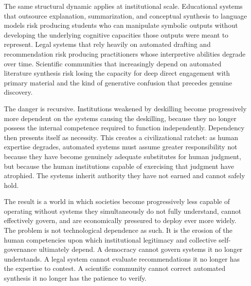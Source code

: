 \documentclass[12pt, a4paper]{article}
\theoremstyle{remark}
\begin{document}
The same structural dynamic applies at institutional scale. Educational systems that outsource explanation, summarization, and conceptual synthesis to language models risk producing students who can manipulate symbolic outputs without developing the underlying cognitive capacities those outputs were meant to represent. Legal systems that rely heavily on automated drafting and recommendation risk producing practitioners whose interpretive abilities degrade over time. Scientific communities that increasingly depend on automated literature synthesis risk losing the capacity for deep direct engagement with primary material and the kind of generative confusion that precedes genuine discovery.

The danger is recursive. Institutions weakened by deskilling become progressively more dependent on the systems causing the deskilling, because they no longer possess the internal competence required to function independently. Dependency then presents itself as necessity. This creates a civilizational ratchet: as human expertise degrades, automated systems must assume greater responsibility not because they have become genuinely adequate substitutes for human judgment, but because the human institutions capable of exercising that judgment have atrophied. The systems inherit authority they have not earned and cannot safely hold.

The result is a world in which societies become progressively less capable of operating without systems they simultaneously do not fully understand, cannot effectively govern, and are economically pressured to deploy ever more widely. The problem is not technological dependence as such. It is the erosion of the human competencies upon which institutional legitimacy and collective self-governance ultimately depend. A democracy cannot govern systems it no longer understands. A legal system cannot evaluate recommendations it no longer has the expertise to contest. A scientific community cannot correct automated synthesis it no longer has the patience to verify.

\begin{center}
\end{center}
\end{document}
